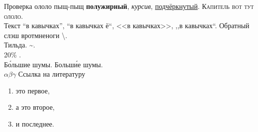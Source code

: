 \documentclass[a4paper,12pt]{report} %
\begin{document}
    \begin{center}
        \begin{minipage}{1\textwidth}
            Проверка ололо пыщ-пыщ \textbf{полужирный}, \textit{курсив}, \underline{подчёркнутый}. \textsc{Капитель вот тут ололо}. \\
            Текст ``в кавычках'', ``в кавычках ё``, <<в кавычках>>, ,,в кавычках``.
            Обратный слэш вротмненоги \textbackslash. \\
            Тильда. \textasciitilde. \\
            20\% .\\
            Б\'{о}льшие шумы. Больш\'{и}е шумы.\\
            $ \alpha \beta \gamma $
            Ссылка на литературу \cite{catheydowskinewparadigm}
        \end{minipage}
    \end{center}
    
    \begin{enumerate}
        \item это первое,
        \item а это второе,
        \item и последнее.
    \end{enumerate}
    
%    
%    
%    
%    
\end{document}
